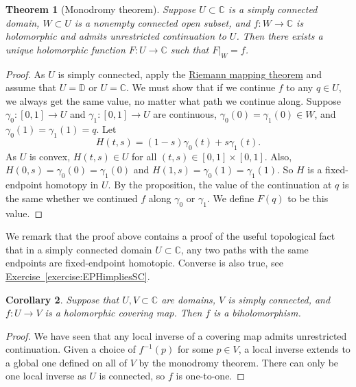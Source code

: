 \documentclass[12pt,openany]{book}
\newcommand{\C}{{\mathbb{C}}}
\newcommand{\D}{{\mathbb{D}}}
\theoremstyle{plain}
\newtheorem{thm}{Theorem}[section]
\newtheorem{cor}[thm]{Corollary}
\theoremstyle{remark}
\theoremstyle{definition}
\theoremstyle{exercise}
\theoremstyle{example}
\newcommand{\exerciseref}[1]{\hyperref[#1]{Exercise~\ref*{#1}}}
\begin{document}
\begin{thm}[Monodromy theorem]
Suppose $U \subset \C$ is a simply connected domain, $W \subset U$ is a
nonempty connected open subset, and
$f \colon W \to \C$ is holomorphic and admits unrestricted continuation
to $U$.  Then there exists
a unique holomorphic function $F \colon U \to \C$ such that $F|_W = f$.
\end{thm}

\begin{proof}
As $U$ is simply connected, apply the
\hyperref[thm:RMT]{Riemann mapping theorem}
and
assume that $U=\D$ or $U = \C$.
We must show that if we continue $f$ to any $q \in U$, we
always get the same value,
no matter what path we continue along.
Suppose $\gamma_0 \colon [0,1] \to U$ and
$\gamma_1 \colon [0,1] \to U$ are continuous,
$\gamma_0(0)=\gamma_1(0) \in W$,
and
$\gamma_0(1)=\gamma_1(1)=q$.  Let
\begin{equation*}
H(t,s) = (1-s)\gamma_0(t)+s\gamma_1(t) .
\end{equation*}
As $U$ is convex, $H(t,s) \in U$ for all $(t,s) \in
[0,1]\times[0,1]$.  Also,
$H(0,s) = \gamma_0(0)=\gamma_1(0)$ and
$H(1,s) = \gamma_0(1)=\gamma_1(1)$.  So $H$ is a fixed-endpoint homotopy in
$U$. By the proposition, the value of the continuation at
$q$ is the same whether we continued $f$ along $\gamma_0$ or $\gamma_1$.
We define $F(q)$ to be this value.
\end{proof}

We remark that the proof above contains
a proof of the useful topological fact that in a
simply connected domain $U \subset \C$, any two 
paths with the same endpoints are fixed-endpoint homotopic.
Converse is also true, see
\exerciseref{exercise:EPHimpliesSC}.

\begin{cor}
Suppose that $U,V \subset \C$ are domains, $V$ is simply connected,
and $f \colon U \to V$ is a holomorphic covering map.
Then $f$ is a biholomorphism.
\end{cor}

\begin{proof}
We have seen that any local inverse of a covering map admits unrestricted
continuation.  Given a choice of $f^{-1}(p)$ for some $p \in V$,
a local inverse extends to a global one defined on all of $V$ by the monodromy theorem.
There can only be one local inverse as $U$ is connected, so $f$ is one-to-one.
\end{proof}
\end{document}

